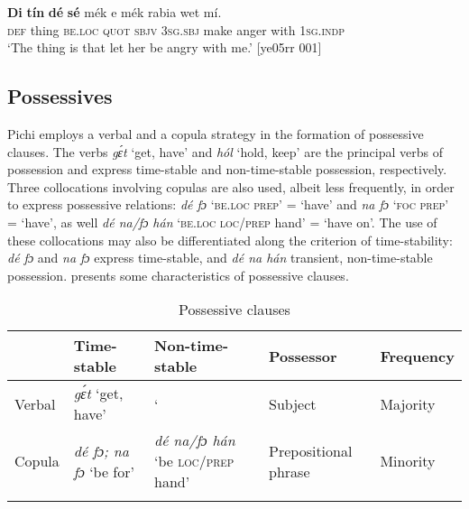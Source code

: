 \ea%
    \label{ex:key:816}
    \gll \textbf{Di}  \textbf{tín}    \textbf{dé}    \textbf{sé}   mék    e    mék    rabia  wet    mí.\\
\textsc{def}  thing  \textsc{be.loc}  \textsc{quot}    \textsc{sbjv}    \textsc{3sg.sbj}  make  anger  with    \textsc{1sg.indp}\\

\glt ‘The thing is that let her be angry with me.’ [ye05rr 001]
\z

\subsection{Possessives}\label{sec:7.6.4}

Pichi employs a verbal and a copula strategy in the formation of possessive clauses. The verbs \textit{gɛ́t} ‘get, have’ and \textit{hól} ‘hold, keep’ are the principal verbs of possession and express time-stable and non-time-stable possession, respectively. Three collocations involving copulas are also used, albeit less frequently, in order to express possessive relations: \textit{dé fɔ} ‘\textsc{be.loc prep}’ = ‘have’ and \textit{na fɔ} ‘\textsc{foc prep}’ = ‘have’, as well \textit{dé na/fɔ hán} ‘\textsc{be.loc loc/prep} hand’ = ‘have on’. The use of these collocations may also be differentiated along the criterion of time-stability: \textit{dé fɔ} and \textit{na fɔ} express time-stable, and \textit{dé na hán} transient, non-time-stable possession.  presents some characteristics of possessive clauses.

\begin{table}
\caption{Possessive clauses}
\label{tab:key:7.10}

\begin{tabularx}{\textwidth}{l>{\raggedright}p{22mm}Qp{20mm}l}
\lsptoprule
 & Time-stable & Non-time-stable & Possessor & Frequency\\
 \midrule 
Verbal & \textit{gɛ́t} ‘get, have’ &  ‘ & Subject & Majority\\ \tablevspace
Copula & {\itshape dé fɔ; na fɔ} 
‘be for’ & {\itshape dé na\textup{/}fɔ hán} 
‘be \textsc{loc/prep} hand’ & Prepositional phrase & Minority\\
\lspbottomrule
\end{tabularx}
\end{table}


